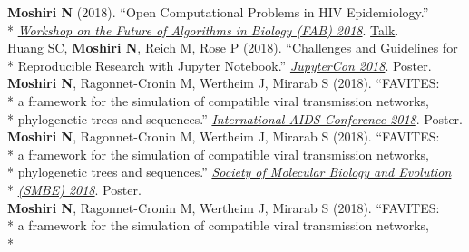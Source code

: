 \documentclass[margin,line]{res}
\begin{document}
\begin{resume}
\hspace*{4mm} \textbf{Moshiri N} (2018). ``Open Computational Problems in HIV Epidemiology.''\\*\vspace{2mm}
\hspace*{8mm} \href{http://fab2018.cbd.cmu.edu/}{\textit{Workshop on the Future of Algorithms in Biology (FAB) 2018}}. \href{https://youtu.be/ENKBbV_30kk}{Talk}.\\
\hspace*{4mm} Huang SC, \textbf{Moshiri N}, Reich M, Rose P (2018). ``Challenges and Guidelines for\\*\vspace{2mm}
\hspace*{8mm} Reproducible Research with Jupyter Notebook.'' \href{https://conferences.oreilly.com/jupyter/jup-ny}{\textit{JupyterCon 2018}}. Poster.\\
\hspace*{4mm} \textbf{Moshiri N}, Ragonnet-Cronin M, Wertheim J, Mirarab S (2018). ``FAVITES:\\*
\hspace*{9mm} a framework for the simulation of compatible viral transmission networks,\\*\vspace{2mm}
\hspace*{8mm} phylogenetic trees and sequences.'' \href{https://www.aids2018.org/}{\textit{International AIDS Conference 2018}}. Poster.\\
\hspace*{4mm} \textbf{Moshiri N}, Ragonnet-Cronin M, Wertheim J, Mirarab S (2018). ``FAVITES:\\*
\hspace*{9mm} a framework for the simulation of compatible viral transmission networks,\\*
\hspace*{9mm} phylogenetic trees and sequences.'' \href{https://smbe.org/smbe/SMBE2018Meeting/}{\textit{Society of Molecular Biology and Evolution}}\\*\vspace{2mm}
\hspace*{8mm} \href{https://smbe.org/smbe/SMBE2018Meeting/}{\textit{(SMBE) 2018}}. Poster.\\
\hspace*{4mm} \textbf{Moshiri N}, Ragonnet-Cronin M, Wertheim J, Mirarab S (2018). ``FAVITES:\\*
\hspace*{9mm} a framework for the simulation of compatible viral transmission networks,\\*

\end{resume}
\end{document}

